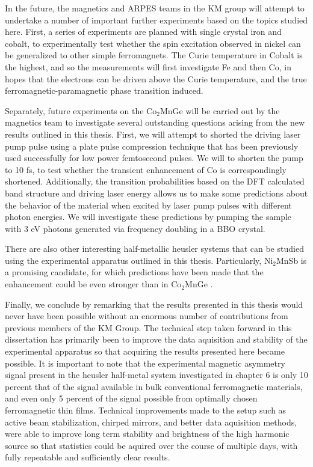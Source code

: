 In the future, the magnetics and ARPES teams in the KM group will attempt to undertake a number of important further experiments based on the topics studied here. First, a series of experiments are planned with single crystal iron and cobalt, to experimentally test whether the spin excitation observed in nickel can be generalized to other simple ferromagnets. The Curie temperature in Cobalt is the highest, and so the measurements will first investigate Fe and then Co, in hopes that the electrons can be driven above the Curie temperature, and the true ferromagnetic-paramagnetic phase transition induced.

Separately, future experiments on the Co$_2$MnGe will be carried out by the magnetics team to investigate several outstanding questions arising from the new results outlined in this thesis. First, we will attempt to shorted the driving laser pump pulse using a plate pulse compression technique that has been previously used successfully for low power femtosecond pulses. We will to shorten the pump to 10 fs, to test whether the transient enhancement of Co is correspondingly shortened. Additionally, the transition probabilities based on the DFT calculated band structure and driving laser energy allows us to make some predictions about the behavior of the material when excited by laser pump pulses with different photon energies. We will investigate these predictions by pumping the sample with 3 eV photons generated via frequency doubling in a BBO crystal.

There are also other interesting half-metallic heusler systems that can be studied using the experimental apparatus outlined in this thesis. Particularly, Ni$_2$MnSb is a promising candidate, for which predictions have been made that the enhancement could be even stronger than in Co$_2$MnGe \cite{Elliott2016}.

Finally, we conclude by remarking that the results presented in this thesis would never have been possible without an enormous number of contributions from previous members of the KM Group. The technical step taken forward in this dissertation has primarily been to improve the data aquisition and stability of the experimental apparatus so that acquiring the results presented here became possible. It is important to note that the experimental magnetic asymmetry signal present in the heusler half-metal system investigated in chapter 6 is only 10 percent that of the signal available in bulk conventional ferromagnetic materials, and even only 5 percent of the signal possible from optimally chosen ferromagnetic thin films. Technical improvements made to the setup such as active beam stabilization, chirped mirrors, and better data aquisition methods, were able to improve long term stability and brightness of the high harmonic source so that statistics could be aquired over the course of multiple days, with fully repeatable and sufficiently clear results.